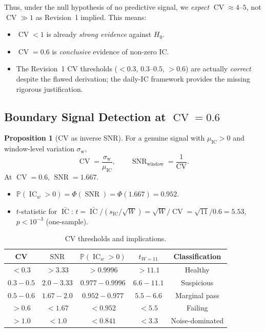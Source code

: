\documentclass[11pt,a4paper]{article}
\theoremstyle{definition}
\newtheorem{proposition}{Proposition}[section]
\newcommand{\IC}{\operatorname{IC}}
\newcommand{\CV}{\operatorname{CV}}
\newcommand{\Prob}{\mathbb{P}}
\newcommand{\Ho}{H_{0}}
\newcommand{\SNR}{\operatorname{SNR}}
\begin{document}
Thus, under the null hypothesis of no predictive signal, we \emph{expect}
$\CV \approx 4$--$5$, not $\CV \gg 1$ as Revision~1 implied. This means:
\begin{itemize}[nosep]
    \item $\CV < 1$ is already \emph{strong evidence} against $\Ho$.
    \item $\CV = 0.6$ is \emph{conclusive} evidence of non-zero IC.
    \item The Revision~1 CV thresholds ($<0.3$, $0.3$--$0.5$, $>0.6$)
          are actually \emph{correct} despite the flawed derivation;
          the daily-IC framework provides the missing rigorous
          justification.
\end{itemize}

\subsection{Boundary Signal Detection at \texorpdfstring{$\CV=0.6$}{CV=0.6}}

\begin{proposition}[CV as inverse SNR]
\label{prop:cv_snr}
For a genuine signal with $\mu_{\IC} > 0$ and window-level
variation $\sigma_{\text{w}}$,
\begin{equation}
    \CV = \frac{\sigma_{\text{w}}}{\mu_{\IC}},
    \qquad
    \SNR_{\text{window}} = \frac{1}{\CV}.
    \label{eq:cv_snr_v2}
\end{equation}
At $\CV=0.6$, $\SNR=1.667$.
\end{proposition}

\begin{itemize}
    \item $\Prob(\IC_{w} > 0) = \Phi(\SNR) = \Phi(1.667) = 0.952$.
    \item $t$-statistic for $\bar{\IC}$:
          $t = \bar{\IC} / (s_{\IC}/\sqrt{W}) = \sqrt{W}/\CV
             = \sqrt{11}/0.6 = 5.53$,
          $p < 10^{-3}$ (one-sample).
\end{itemize}

\begin{table}[htbp]
\centering
\caption{CV thresholds and implications.}
\label{tab:cv_v2}
\begin{tabular}{ccccc}
\toprule
CV & $\SNR$ & $\Prob(\IC_{w}>0)$ & $t_{W=11}$ & Classification \\
\midrule
$<0.3$  & $>3.33$ & $>0.9996$ & $>11.1$ & Healthy \\
$0.3{-}0.5$ & $2.0{-}3.33$ & $0.977{-}0.9996$ & $6.6{-}11.1$ & Suspicious \\
$0.5{-}0.6$ & $1.67{-}2.0$ & $0.952{-}0.977$ & $5.5{-}6.6$ & Marginal pass \\
$>0.6$  & $<1.67$ & $<0.952$ & $<5.5$ & Failing \\
$>1.0$  & $<1.0$  & $<0.841$ & $<3.3$ & Noise-dominated \\
\bottomrule
\end{tabular}
\end{table}
\end{document}
